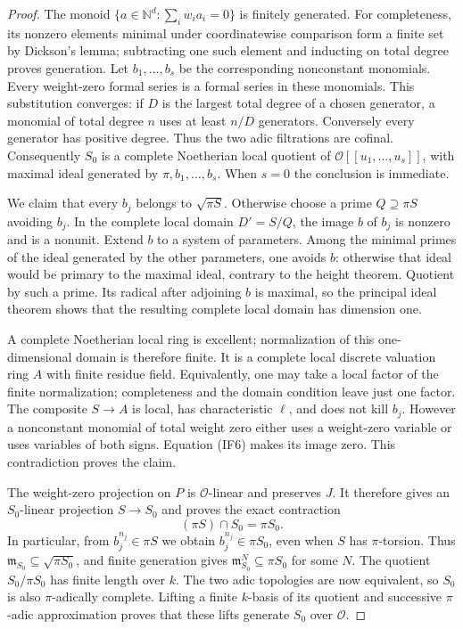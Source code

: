\begin{proof}
The monoid $\{a\in\mathbb N^d:\sum_iw_i a_i=0\}$ is finitely
generated.  For completeness, its nonzero elements minimal under
coordinatewise comparison form a finite set by Dickson's lemma;
subtracting one such element and inducting on total degree proves
generation.  Let $b_1,\ldots,b_s$ be the corresponding nonconstant
monomials.  Every weight-zero formal series is a formal series in
these monomials.  This substitution converges: if $D$ is the largest
total degree of a chosen generator, a monomial of total degree $n$
uses at least $n/D$ generators.  Conversely every generator has
positive degree.  Thus the two adic filtrations are cofinal.
Consequently $S_0$ is a complete Noetherian local quotient of
$\mathcal O[[u_1,\ldots,u_s]]$, with maximal ideal generated by
$\pi,b_1,\ldots,b_s$.  When $s=0$ the conclusion is immediate.

We claim that every $b_j$ belongs to $\sqrt{\pi S}$.  Otherwise
choose a prime $Q\supseteq\pi S$ avoiding $b_j$.  In the complete
local domain $D'=S/Q$, the image $b$ of $b_j$ is nonzero and is a
nonunit.  Extend $b$ to a system of parameters.  Among the minimal
primes of the ideal generated by the other parameters, one avoids
$b$: otherwise that ideal would be primary to the maximal ideal,
contrary to the height theorem.  Quotient by such a prime.  Its
radical after adjoining $b$ is maximal, so the principal ideal
theorem shows that the resulting complete local domain has
dimension one.

A complete Noetherian local ring is excellent; normalization of this
one-dimensional domain is therefore finite\cite{integral-finiteness-stacks}.  It is a complete local
discrete valuation ring $A$ with finite residue field.  Equivalently,
one may take a local factor of the finite normalization; completeness
and the domain condition leave just one factor.  The composite
$S\to A$ is local, has characteristic $\ell$, and does not kill
$b_j$.  However a nonconstant monomial of total weight zero either
uses a weight-zero variable or uses variables of both signs.  Equation
(IF6) makes its image zero.  This contradiction proves the claim.

The weight-zero projection on $P$ is $\mathcal O$-linear and
preserves $J$.  It therefore gives an $S_0$-linear projection
$S\to S_0$ and proves the exact contraction
\[
                  (\pi S)\cap S_0=\pi S_0.             \tag{IF7}
\]
In particular, from $b_j^{n_j}\in\pi S$ we obtain
$b_j^{n_j}\in\pi S_0$, even when $S$ has $\pi$-torsion.
Thus $\mathfrak m_{S_0}\subseteq\sqrt{\pi S_0}$, and finite
generation gives $\mathfrak m_{S_0}^N\subseteq\pi S_0$ for some
$N$.  The quotient $S_0/\pi S_0$ has finite length over $k$.
The two adic topologies are now equivalent, so $S_0$ is also
$\pi$-adically complete.  Lifting a finite $k$-basis of its
quotient and successive $\pi$-adic approximation proves that these
lifts generate $S_0$ over $\mathcal O$.
\end{proof}

